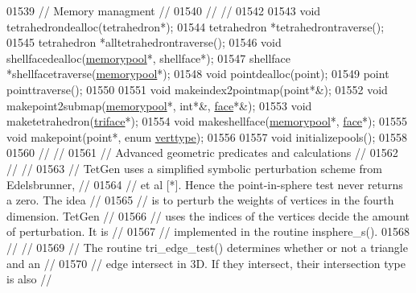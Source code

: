 \begin{DoxyCode}
01539 \textcolor{comment}{//  Memory managment                                                         //}
01540 \textcolor{comment}{//                                                                           //}
01542 \textcolor{comment}{}
01543   \textcolor{keywordtype}{void} tetrahedrondealloc(tetrahedron*);
01544   tetrahedron *tetrahedrontraverse();
01545   tetrahedron *alltetrahedrontraverse();
01546   \textcolor{keywordtype}{void} shellfacedealloc(\hyperlink{classtetgenmesh_1_1memorypool}{memorypool}*, shellface*);
01547   shellface *shellfacetraverse(\hyperlink{classtetgenmesh_1_1memorypool}{memorypool}*);
01548   \textcolor{keywordtype}{void} pointdealloc(point);
01549   point pointtraverse();
01550 
01551   \textcolor{keywordtype}{void} makeindex2pointmap(point*&);
01552   \textcolor{keywordtype}{void} makepoint2submap(\hyperlink{classtetgenmesh_1_1memorypool}{memorypool}*, \textcolor{keywordtype}{int}*&, \hyperlink{classtetgenmesh_1_1face}{face}*&);
01553   \textcolor{keywordtype}{void} maketetrahedron(\hyperlink{classtetgenmesh_1_1triface}{triface}*);
01554   \textcolor{keywordtype}{void} makeshellface(\hyperlink{classtetgenmesh_1_1memorypool}{memorypool}*, \hyperlink{classtetgenmesh_1_1face}{face}*);
01555   \textcolor{keywordtype}{void} makepoint(point*, \textcolor{keyword}{enum} \hyperlink{classtetgenmesh_ad0458f823a5eef2de89c7fae067aa2ac}{verttype});
01556 
01557   \textcolor{keywordtype}{void} initializepools();
01558 
01560 \textcolor{comment}{//                                                                           //}
01561 \textcolor{comment}{// Advanced geometric predicates and calculations                            //}
01562 \textcolor{comment}{//                                                                           //}
01563 \textcolor{comment}{// TetGen uses a simplified symbolic perturbation scheme from Edelsbrunner,  //}
01564 \textcolor{comment}{// et al [*].  Hence the point-in-sphere test never returns a zero. The idea //}
01565 \textcolor{comment}{// is to perturb the weights of vertices in the fourth dimension.  TetGen    //}
01566 \textcolor{comment}{// uses the indices of the vertices decide the amount of perturbation. It is //}
01567 \textcolor{comment}{// implemented in the routine insphere\_s().}
01568 \textcolor{comment}{//                                                                           //}
01569 \textcolor{comment}{// The routine tri\_edge\_test() determines whether or not a triangle and an   //}
01570 \textcolor{comment}{// edge intersect in 3D. If they intersect, their intersection type is also  //}

\end{DoxyCode}
